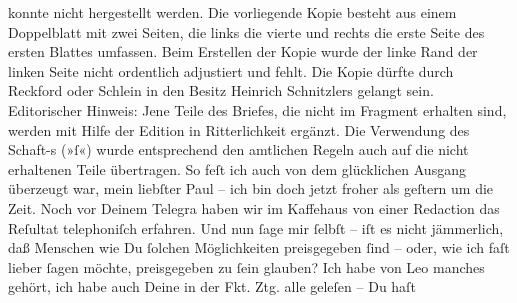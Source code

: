{                                 konnte nicht hergestellt werden. Die vorliegende Kopie besteht aus
                                 einem Doppelblatt mit zwei Seiten, die links die vierte und rechts
                                 die erste Seite des ersten Blattes umfassen. Beim Erstellen der
                                 Kopie wurde der linke Rand der linken Seite nicht ordentlich
                                 adjustiert und fehlt. Die Kopie dürfte durch Reckford oder Schlein in den Besitz Heinrich Schnitzlers gelangt sein. 
\newline{}Editorischer Hinweis: Jene Teile des Briefes, die nicht im Fragment erhalten sind,
                                 werden mit Hilfe der Edition in Ritterlichkeit ergänzt. Die Verwendung des Schaft-s (»ſ«)
                                 wurde entsprechend den amtlichen Regeln auch auf die nicht
                                 erhaltenen Teile übertragen. }
\toendnotes[C]{\smallbreak}
\pstart
           \noindent{}{\pb}So feſt ich auch von dem glücklichen Ausgang
               überzeugt war, mein liebſter Paul – ich bin doch jetzt froher als geſtern um die Zeit. Noch vor Deinem Telegra{\geminationm} haben wir im Kaffehaus von einer Redaction {\pb}das Reſultat telephoniſch erfahren. Und nun ſage mir
               ſelbſt – iſt es nicht jämmerlich, daß Menschen wie Du ſolchen Möglichkeiten
               preisgegeben ſind – oder, wie ich faſt lieber ſagen möchte, preisgegeben zu ſein
               glauben? Ich habe von Leo manches gehört, ich
               habe auch Deine \label{K_L02686-1v}\label{K_L02686-1} in der Fkt. Ztg. alle geleſen – Du haſt

